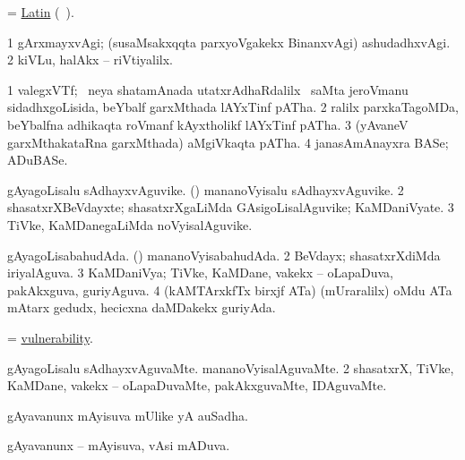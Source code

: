 \bentry
{}
\gl{\nA}
\expl{}
\bmng
 = \hyperref{kandict_l.pdf}{L}{Latin pagu(9)}{Latin} (\pagu\ ). 
\emng
\eentry

\bentry
{} 
\gl{\kirxvi}
\expl{}
\bmng
\bnum
\num{1} gArxmayxvAgi; (susaMsakxqqta parxyoVgakekx BinanxvAgi) ashudadhxvAgi. 
\num{2} kiVLu, halAkx -- riVtiyalilx. 
\enum
\emng
\eentry

\bentry 
{} 
\gl{\nA}
\expl{}
\bmng
\bnum
\num{1} valegxVTf; \kirxsha\ neya shatamAnada utatxrAdhaRdalilx \kanmu\ saMta jeroVmanu sidadhxgoLisida, beYbalf garxMthada lAYxTinf pATha. 
\num{2} ralilx parxkaTagoMDa, beYbalfna adhikaqta roVmanf kAyxtholikf lAYxTinf pATha. 
\num{3}  (yAvaneV garxMthakataRna garxMthada) aMgiVkaqta pATha. 
\num{4}  janasAmAnayxra BASe; ADuBASe. 
\enum
\emng
\eentry

\bentry 
{} 
\gl{\nA}
\expl{}
\bmng
\bnum
{} 
\banum
{} gAyagoLisalu sAdhayxvAguvike. 
 (\rUpa) mananoVyisalu sAdhayxvAguvike. 
\eanum
\numie
\num{2} shasatxrXBeVdayxte; shasatxrXgaLiMda GAsigoLisalAguvike; KaMDaniVyate. 
\num{3} TiVke, KaMDanegaLiMda noVyisalAguvike. 
\enum
\emng
\eentry

\bentry
{} 
\gl{\gu}
\expl{}
\bmng
\bnum
{} 
\banum
{} gAyagoLisabahudAda. 
 (\rUpa) mananoVyisabahudAda. 
\eanum
\numie
\num{2} BeVdayx; shasatxrXdiMda iriyalAguva. 
\num{3} KaMDaniVya; TiVke, KaMDane, \mo vakekx -- oLapaDuva, pakAkxguva, guriyAguva. 
\num{4} (kAMTArxkfTx birxjf ATa) (mUraralilx) oMdu ATa mAtarx gedudx, hecicxna daMDakekx guriyAda. 
\enum
\emng
\eentry

\bentry 
{} 
\gl{\nA}
\expl{}
\bmng
 = \hyperlink{vulnerability}{vulnerability}. 
\emng
\eentry

\bentry
{} 
\gl{\kirxvi}
\expl{}
\bmng
\bnum
{} 
\banum
{} gAyagoLisalu sAdhayxvAguvaMte. 
 mananoVyisalAguvaMte. 
\eanum
\numie
\num{2} shasatxrX, TiVke, KaMDane, \mo vakekx -- oLapaDuvaMte, pakAkxguvaMte, IDAguvaMte. 
\enum
\emng
\eentry

\bentry 
{} 
\gl{\nA}
\bmng
 gAyavanunx mAyisuva mUlike yA auSadha. 
\emng
\eentry

\bentry
{} 
\gl{\gu}
\expl{}
\bmng
 gAyavanunx -- mAyisuva, vAsi mADuva. 
\emng
\eentry

